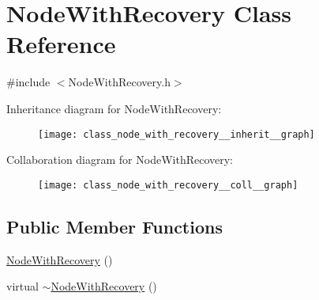 \hypertarget{class_node_with_recovery}{}\section{Node\+With\+Recovery Class Reference}
\label{class_node_with_recovery}


{\ttfamily \#include $<$Node\+With\+Recovery.\+h$>$}



Inheritance diagram for Node\+With\+Recovery\+:\nopagebreak
\begin{figure}[H]
\begin{center}
\leavevmode
\texttt{[image: class\_node\_with\_recovery\_\_inherit\_\_graph]}
\end{center}
\end{figure}


Collaboration diagram for Node\+With\+Recovery\+:\nopagebreak
\begin{figure}[H]
\begin{center}
\leavevmode
\texttt{[image: class\_node\_with\_recovery\_\_coll\_\_graph]}
\end{center}
\end{figure}
\subsection*{Public Member Functions}
\begin{DoxyCompactItemize}
\item 
\hyperlink{class_node_with_recovery_aed1d9b2cfa7729902c90c103ab3075ff}{Node\+With\+Recovery} ()
\item 
virtual \hyperlink{class_node_with_recovery_a5cb1367a800cf960b96c9011ab94a616}{$\sim$\+Node\+With\+Recovery} ()
\end{DoxyCompactItemize}
